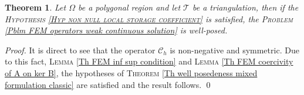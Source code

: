\documentclass[3p]{elsarticle}
\newtheorem{theorem}{Theorem}
\def\C{{\mathcal C}}
\def\triang{\mathcal{T}}
\begin{document}
%
%
\begin{theorem}\label{Th FEM Well Posedness Problem}
Let $\Omega$ be a polygonal region and let $\triang$ be a triangulation, then if the \textsc{Hypothesis \ref{Hyp non null local storage coefficient}} is satisfied, the \textsc{Problem} \eqref{Pblm FEM operators weak continuous solution} is well-posed.
\end{theorem}
%
%
\begin{proof}
%
It is direct to see that the operator $\C_{h}$ is non-negative and symmetric. Due to this fact, \textsc{Lemma} \ref{Th FEM inf sup condition} and \textsc{Lemma} \ref{Th FEM coercivity of A on ker B}, the hypotheses of \textsc{Theorem} \ref{Th well posedeness mixed formulation classic} are satisfied and the result follows. 
%
\qed
\end{proof}
%
%
%
%
%
%
%
%
%
\end{document}
